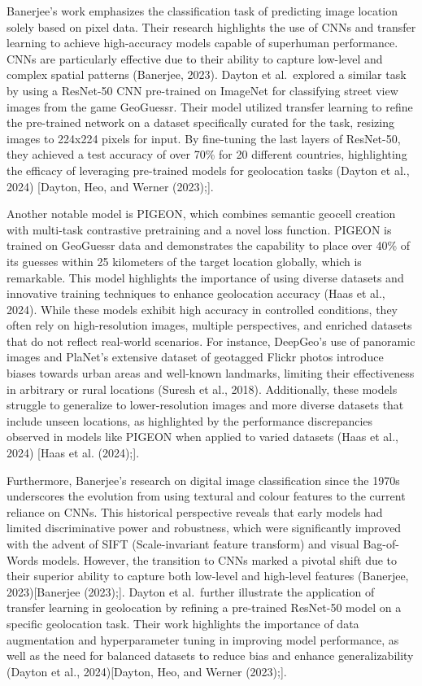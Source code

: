 Banerjee's work emphasizes the classification task of predicting image
location solely based on pixel data. Their research highlights the use
of CNNs and transfer learning to achieve high-accuracy models capable of
superhuman performance. CNNs are particularly effective due to their
ability to capture low-level and complex spatial patterns (Banerjee,
2023). Dayton et al.~explored a similar task by using a ResNet-50 CNN
pre-trained on ImageNet for classifying street view images from the game
GeoGuessr. Their model utilized transfer learning to refine the
pre-trained network on a dataset specifically curated for the task,
resizing images to 224x224 pixels for input. By fine-tuning the last
layers of ResNet-50, they achieved a test accuracy of over 70\% for 20
different countries, highlighting the efficacy of leveraging pre-trained
models for geolocation tasks (Dayton et al., 2024) {[}Dayton, Heo, and
Werner (2023);{]}.

Another notable model is PIGEON, which combines semantic geocell
creation with multi-task contrastive pretraining and a novel loss
function. PIGEON is trained on GeoGuessr data and demonstrates the
capability to place over 40\% of its guesses within 25 kilometers of the
target location globally, which is remarkable. This model highlights the
importance of using diverse datasets and innovative training techniques
to enhance geolocation accuracy (Haas et al., 2024). While these models
exhibit high accuracy in controlled conditions, they often rely on
high-resolution images, multiple perspectives, and enriched datasets
that do not reflect real-world scenarios. For instance, DeepGeo's use of
panoramic images and PlaNet's extensive dataset of geotagged Flickr
photos introduce biases towards urban areas and well-known landmarks,
limiting their effectiveness in arbitrary or rural locations (Suresh et
al., 2018). Additionally, these models struggle to generalize to
lower-resolution images and more diverse datasets that include unseen
locations, as highlighted by the performance discrepancies observed in
models like PIGEON when applied to varied datasets (Haas et al., 2024)
{[}Haas et al. (2024);{]}.

Furthermore, Banerjee's research on digital image classification since
the 1970s underscores the evolution from using textural and colour
features to the current reliance on CNNs. This historical perspective
reveals that early models had limited discriminative power and
robustness, which were significantly improved with the advent of SIFT
(Scale-invariant feature transform) and visual Bag-of-Words models.
However, the transition to CNNs marked a pivotal shift due to their
superior ability to capture both low-level and high-level features
(Banerjee, 2023){[}Banerjee (2023);{]}. Dayton et al.~further illustrate
the application of transfer learning in geolocation by refining a
pre-trained ResNet-50 model on a specific geolocation task. Their work
highlights the importance of data augmentation and hyperparameter tuning
in improving model performance, as well as the need for balanced
datasets to reduce bias and enhance generalizability (Dayton et al.,
2024){[}Dayton, Heo, and Werner (2023);{]}.


